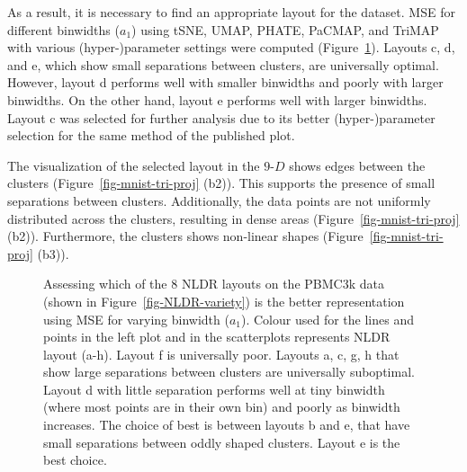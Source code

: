 \documentclass[
  12pt]{article}
\begin{document}
As a result, it is necessary to find an appropriate layout for the
dataset. MSE for different binwidths (\(a_1\)) using tSNE, UMAP, PHATE,
PaCMAP, and TriMAP with various (hyper-)parameter settings were computed
(Figure~\ref{fig-pbmc-mse}). Layouts c, d, and e, which show small
separations between clusters, are universally optimal. However, layout d
performs well with smaller binwidths and poorly with larger binwidths.
On the other hand, layout e performs well with larger binwidths. Layout
c was selected for further analysis due to its better (hyper-)parameter
selection for the same method of the published plot.

The visualization of the selected layout in the \(9\text{-}D\) shows
edges between the clusters (Figure~\ref{fig-mnist-tri-proj} (b2)). This
supports the presence of small separations between clusters.
Additionally, the data points are not uniformly distributed across the
clusters, resulting in dense areas (Figure~\ref{fig-mnist-tri-proj}
(b2)). Furthermore, the clusters shows non-linear shapes
(Figure~\ref{fig-mnist-tri-proj} (b3)).

\begin{figure}[H]


\caption{\label{fig-pbmc-mse}Assessing which of the 8 NLDR layouts on
the PBMC3k data (shown in Figure~\ref{fig-NLDR-variety}) is the better
representation using MSE for varying binwidth (\(a_1\)). Colour used for
the lines and points in the left plot and in the scatterplots represents
NLDR layout (a-h). Layout f is universally poor. Layouts a, c, g, h that
show large separations between clusters are universally suboptimal.
Layout d with little separation performs well at tiny binwidth (where
most points are in their own bin) and poorly as binwidth increases. The
choice of best is between layouts b and e, that have small separations
between oddly shaped clusters. Layout e is the best choice.}

\end{figure}%
\end{document}

